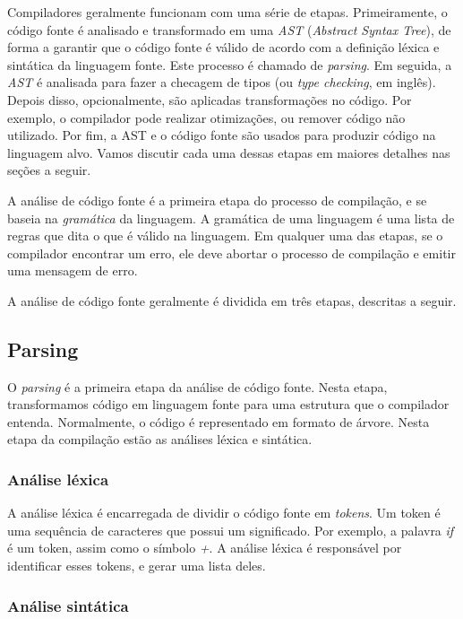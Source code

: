 Compiladores geralmente funcionam com uma série de etapas. Primeiramente, o
código fonte é analisado e transformado em uma \textit{AST}
(\textit{Abstract Syntax Tree}), de forma a garantir que o código fonte é válido de
acordo com a definição léxica e sintática da linguagem fonte. Este processo é
chamado de \textit{parsing}. Em seguida, a \textit{AST} é analisada para fazer
a checagem de tipos (ou \textit{type checking}, em inglês).  Depois disso,
opcionalmente, são aplicadas transformações no código. Por exemplo, o compilador
pode realizar otimizações, ou remover código não utilizado. Por fim, a AST e o
código fonte são usados para produzir código na linguagem alvo. Vamos discutir
cada uma dessas etapas em maiores detalhes nas seções a seguir.

A análise de código fonte é a primeira etapa do processo de compilação, e se
baseia na \textit{gramática} da linguagem. A gramática de uma linguagem é uma lista
de regras que dita o que é válido na linguagem. Em qualquer uma das etapas, se o
compilador encontrar um erro, ele deve abortar o processo de compilação e emitir
uma mensagem de erro.

A análise de código fonte geralmente é dividida em três etapas, descritas a seguir.

\subsection{Parsing}

O \textit{parsing} é a primeira etapa da análise de código fonte. Nesta etapa,
transformamos código em linguagem fonte para uma estrutura que o compilador
entenda. Normalmente, o código é representado em formato de árvore. Nesta etapa
da compilação estão as análises léxica e sintática.

\subsubsection{Análise léxica}

A análise léxica é encarregada de dividir o código fonte em \textit{tokens}. Um
token é uma sequência de caracteres que possui um significado. Por exemplo, a
palavra \textit{if} é um token, assim como o símbolo \textit{+}. A análise léxica
é responsável por identificar esses tokens, e gerar uma lista deles.


\subsubsection{Análise sintática}

